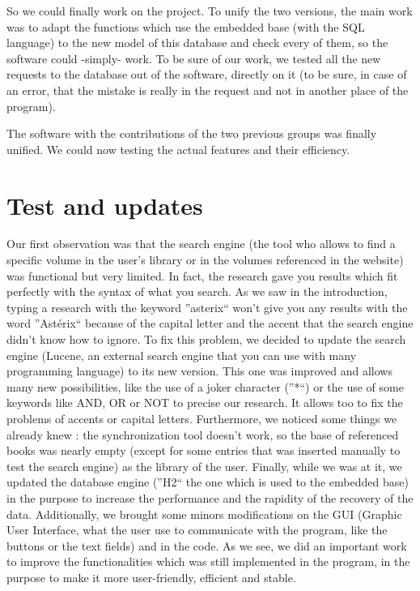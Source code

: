 \documentclass[11pt]{report} %
\begin{document}
So we could finally work on the project. To unify the two versions, the main work was to adapt the functions which use the embedded base (with the SQL language) to the new model of this database and check every of them, so the software could -simply- work. To be sure of our work, we tested all the new requests to the database out of the software, directly on it (to be sure, in case of an error, that the mistake is really in the request and not in another place of the program).

The software with the contributions of the two previous groups was finally unified. We could now testing the actual features and their efficiency.

\section{Test and updates}
Our first observation was that the search engine (the tool who allows to find a specific volume in the user's library or in the volumes referenced in the website) was functional but very limited. In fact, the research gave you results which fit perfectly with the syntax of what you search. As we saw in the introduction, typing a research with the keyword ''asterix`` won't give you any results with the word ''Astérix`` because of the capital letter and the accent that the search engine didn't know how to ignore. 
\newline To fix this problem, we decided to update the search engine (Lucene, an external search engine that you can use with many programming language) to its new version. This one was improved and allows many new possibilities, like the use of a joker character (''*``) or the use of some keywords like AND, OR or NOT to precise our research. It allows too to fix the problems of accents or capital letters.
\newline Furthermore, we noticed some things we already knew : the synchronization tool doesn't work, so the base of referenced books was nearly empty (except for some entries that was inserted manually to test the search engine) as the library of the user.
\newline Finally, while we was at it, we updated the database engine (''H2`` the one which is used to the embedded base) in the purpose to increase the performance and the rapidity of the recovery of the data. Additionally, we brought some minors modifications on the GUI (Graphic User Interface, what the user use to communicate with the program, like the buttons or the text fields) and in the code.
\newline As we see, we did an important work to improve the functionalities which was still implemented in the program, in the purpose to make it more user-friendly, efficient and stable.
\end{document}

